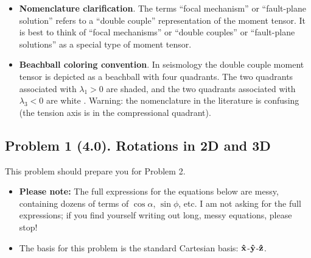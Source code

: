 \documentclass[11pt,titlepage,fleqn]{article}
\newcommand{\rotangA}{\alpha}
\begin{document}
\begin{spacing}{1.0}
\begin{itemize}
\item {\bf Nomenclature clarification}. 
The terms ``focal mechanism'' or ``fault-plane solution'' refers to a ``double couple'' representation of the moment tensor. It is best to think of ``focal mechanisms'' or ``double couples'' or ``fault-plane solutions'' as a special type of moment tensor.

\item {\bf Beachball coloring convention}. 
In seismology the double couple moment tensor is depicted as a beachball with four quadrants. The two quadrants associated with \mbox{$\lambda_1 > 0$} are shaded, and the two quadrants associated with \mbox{$\lambda_3 < 0$} are white \citep[][p.~257]{ShearerE2} \citep[][p.~224]{SteinWysession}. Warning: the nomenclature in the literature is confusing (\eg the tension axis is in the compressional quadrant).

\end{itemize}

\end{spacing}


\pagebreak
\subsection*{Problem 1 (4.0). Rotations in 2D and 3D}

This problem should prepare you for Problem 2.
%
\begin{itemize}
\item {\bf Please note:} The full expressions for the equations below are messy, containing dozens of terms of $\cos\rotangA$, $\sin\phi$, etc. I am not asking for the full expressions; if you find yourself writing out long, messy equations, please stop!
\item The basis for this problem is the standard Cartesian basis: $\mbox{\boldmath{$\hat{\rm x}$}}$-$\mbox{\boldmath{$\hat{\rm y}$}}$-$\mbox{\boldmath{$\hat{\rm z}$}}$.
\end{itemize}

\end{document}
